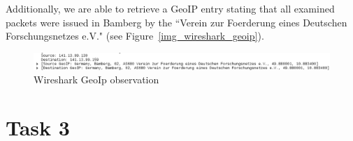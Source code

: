 \documentclass[12pt]{article}
\begin{document}
Additionally, we are able to retrieve a GeoIP entry stating that all examined packets were issued in Bamberg by the ``Verein zur Foerderung eines Deutschen Forschungsnetzes e.V." (see Figure~\ref{img_wireshark_geoip}).

\begin{figure}[h]%
\centering%
\includegraphics[width=\textwidth]{images/wireshark_geoip.png}%
\caption{Wireshark GeoIp observation}%
\label{img_wireshark_browser}%
\end{figure}%


\section{Task 3}\label{task3}
\end{document}
